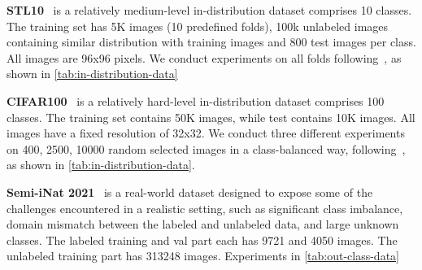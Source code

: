 \documentclass[10pt,twocolumn,letterpaper]{article}
\begin{document}
\textbf{STL10}~\cite{coates2011analysis} is a relatively medium-level in-distribution dataset comprises 10 classes. The training set has 5K images (10 predefined folds), 100k unlabeled images containing similar distribution with training images and 800 test images per class. All images are 96x96 pixels. We conduct experiments on all folds following~\cite{sohn2020fixmatch}, as shown in \cref{tab:in-distribution-data}

\textbf{CIFAR100}~\cite{krizhevsky2009learning} is a relatively hard-level in-distribution dataset comprises 100 classes. The training set contains 50K images, while test contains 10K images. All images have a fixed resolution of 32x32. We conduct three different experiments on 400, 2500, 10000 random selected images in a class-balanced way, following~\cite{sohn2020fixmatch}, as shown in \cref{tab:in-distribution-data}. 

\textbf{Semi-iNat 2021}~\cite{su2021semi_iNat} is a real-world dataset designed to expose some of the challenges encountered in a realistic setting, such as significant class imbalance, domain mismatch between the labeled and unlabeled data, and large unknown classes. The labeled training and val part each has 9721 and 4050 images. The unlabeled training part has 313248 images. Experiments in \cref{tab:out-class-data}
\end{document}
